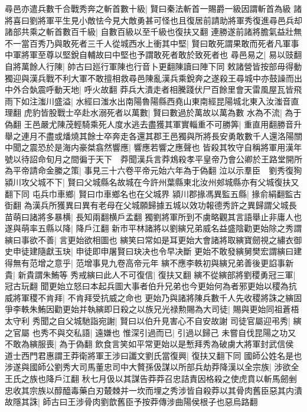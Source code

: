 尋邑亦遣兵數千合戰秀奔之斬首數十級|{
	賢曰秦法斬首一賜爵一級因謂斬首為級}
諸將喜曰劉將軍平生見小敵怯今見大敵勇甚可怪也且復居前請助將軍秀復進尋邑兵却諸部共乘之斬首數百千級|{
	自數百級以至千級也復扶又翻}
連勝遂前諸將膽氣益壯無不一當百秀乃與敢死者三千人從城西水上衝其中堅|{
	賢曰敢死謂果敢而死者凡軍事中軍將軍至尊以堅銳自輔故曰中堅也予謂敢死者敢於致死者也}
尋邑易之|{
	易以豉翻}
自將萬餘人行陳|{
	帥古曰廵行軍陳也行音卜更翻陳讀曰陣下同}
敕諸營皆按部毋得動獨迎與漢兵戰不利大軍不敢擅相救尋邑陳亂漢兵乘銳奔之遂殺王尋城中亦鼓譟而出中外合埶震呼動天地|{
	呼火故翻}
莽兵大潰走者相騰踐伏尸百餘里會天雷風屋瓦皆飛雨下如注滍川盛溢|{
	水經曰滍水出南陽魯陽縣西堯山東南經昆陽城北東入汝滍音直理翻}
虎豹皆股戰士卒赴水溺死者以萬數|{
	賢曰數過於萬故以萬為數}
水為不流|{
	為于偽翻}
王邑嚴尤陳茂輕騎乘死人度水逃去盡獲其軍實輜重不可勝筭|{
	重直用翻勝音升}
舉之連月不盡或燔燒其餘士卒奔走各還其郡王邑獨與所將長安勇敢數千人還洛陽關中聞之震恐於是海内豪桀翕然響應|{
	響應若響之應聲也}
皆殺其牧守自稱將軍用漢年號以待詔命旬月之間徧于天下　莽聞漢兵言莽鴆殺孝平皇帝乃會公卿於王路堂開所為平帝請命金縢之策|{
	事見三十六卷平帝元始六年為于偽翻}
泣以示羣臣　劉秀復狥潁川攻父城不下|{
	賢曰父城縣名故城在今許州葉縣東北汝州郟城縣亦有父城復扶又翻下同}
屯兵巾車鄉|{
	賢曰巾車鄉名也在父城界}
潁川郡掾馮異監五縣|{
	掾俞絹翻監古衘翻}
為漢兵所獲異曰異有老母在父城願歸據五城以效功報德秀許之異歸謂父城長苗萌曰諸將多暴横|{
	長知兩翻横戶孟翻}
獨劉將軍所到不虜略觀其言語舉止非庸人也遂與萌率五縣以降|{
	降戶江翻}
新市平林諸將以劉縯兄弟威名益盛陰勸更始除之秀謂縯曰事欲不善|{
	言更始欲相圖也}
縯笑曰常如是耳更始大會諸將取縯寶劒視之繡衣御史申徒建隨獻玉玦|{
	申徒即申屠賢曰玦决也令早决斷}
更始不敢發縯舅樊宏謂縯曰建得無有范增之意乎|{
	范增事見九卷高帝元年}
縯不應李軼初與縯兄弟善後更諂事新貴|{
	新貴謂朱鮪等}
秀戒縯曰此人不可復信|{
	復扶又翻}
縯不從縯部將劉稷勇冠三軍|{
	冠古玩翻}
聞更始立怒曰本起兵圖大事者伯升兄弟也今更始何為者邪更始以稷為抗威將軍稷不肯拜|{
	不肯拜受抗威之命也}
更始乃與諸將陳兵數千人先收稷將誅之縯固爭李軼朱鮪因勸更始并執縯即日殺之以族兄光禄勲賜為大司徒|{
	賜與更始同祖蒼梧太守利}
秀聞之自父城馳詣宛謝|{
	賢曰以伯升見害心不自安故謝}
司徒官屬迎弔秀|{
	縯之官屬}
也秀不與交私語|{
	遠嫌也}
惟深引過而已|{
	引過以歸己}
未嘗自伐昆陽之功又不敢為縯服喪|{
	為于偽翻}
飲食言笑如平常更始以是慙拜秀為破虜大將軍封武信侯　道士西門君惠謂王莽衛將軍王涉曰讖文劉氏當復興|{
	復扶又翻下同}
國師公姓名是也涉遂與國師公劉秀大司馬董忠司中大贅孫伋謀以所部兵劫莽降漢以全宗族|{
	涉欲全王氏之族也降戶江翻}
秋七月伋以其謀告莽莽召忠詰責因格殺之使虎賁以斬馬劒剉忠收其宗族以醇醯毒藥白刃樷棘并一坎而埋之秀涉皆自殺莽以其骨肉舊臣惡其内潰故隱其誅|{
	師古曰王涉骨肉劉歆舊臣予按莽傳涉曲陽侯根子也惡烏路翻}
